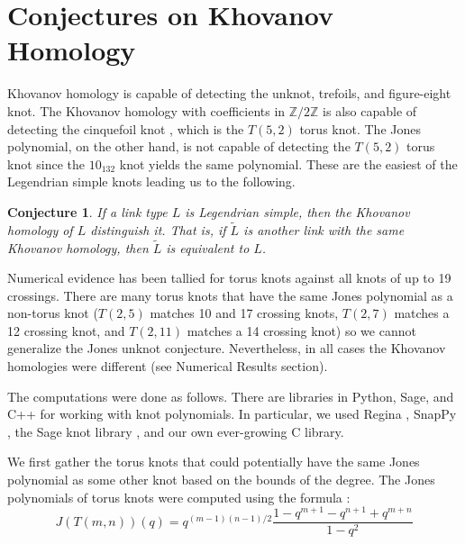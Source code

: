 \documentclass{article}
\theoremstyle{plain}
\newtheorem{conjecture}{Conjecture}
\begin{document}
    \section{Conjectures on Khovanov Homology}
        Khovanov homology is capable of detecting the
        unknot, trefoils, and figure-eight knot. The Khovanov homology with
        coefficients in $\mathbb{Z}/2\mathbb{Z}$ is also capable of detecting
        the cinquefoil knot \cite{BaldwinYingSivekCinquefoilKhovanov},
        which is the $T(5,2)$ torus knot. The Jones
        polynomial, on the other hand, is not capable of detecting the
        $T(5,2)$ torus knot since the $10_{132}$ knot yields the same
        polynomial. These are the easiest of the Legendrian simple knots
        leading us to the following.
        \begin{conjecture}
            If a link type $L$ is Legendrian simple, then the Khovanov homology
            of $L$ distinguish it. That is, if $\tilde{L}$
            is another link with the same Khovanov homology, then $\tilde{L}$ is
            equivalent to $L$.
        \end{conjecture}
        Numerical evidence has been tallied for torus knots
        against all knots of up to 19 crossings. There are many
        torus knots that have the same Jones polynomial as a non-torus knot
        ($T(2,5)$ matches 10 and 17 crossing knots, $T(2,7)$
        matches a 12 crossing knot, and $T(2,11)$ matches a 14 crossing knot)
        so we cannot generalize the Jones unknot conjecture. Nevertheless, in
        all cases the Khovanov homologies were different
        (see Numerical Results section).
        \par\hfill\par
        The computations were done as follows. There are libraries in Python,
        Sage, and C++ for working with knot polynomials. In particular, we used
        Regina \cite{regina}, SnapPy \cite{SnapPy}, the Sage knot library
        \cite{sage}, and our own ever-growing C library.
        \par\hfill\par
        We first gather the torus knots that could potentially have the same
        Jones polynomial as some other knot based on the bounds of the degree.
        The Jones polynomials of torus knots were computed using the formula
        \cite{jonesfordummyvjones}:
        \begin{equation}
            \label{eqn:jones_poly_torus}%
            J(T(m,n))(q)=q^{(m-1)(n-1)/2}
                \frac{1-q^{m+1}-q^{n+1}+q^{m+n}}{1-q^{2}}
        \end{equation}
\end{document}
